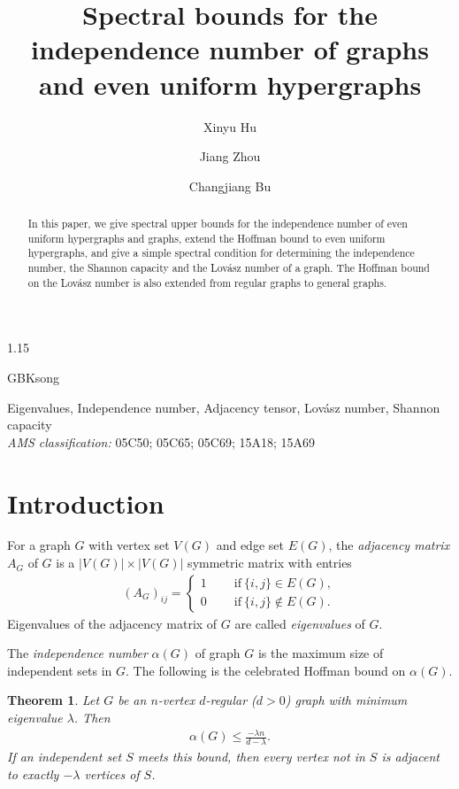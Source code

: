 \documentclass[preprint,12pt]{elsarticle}
\newtheorem{thm}{Theorem}[section]
\begin{document}
\begin{spacing}{1.15}
\begin{CJK*}{GBK}{song}
\begin{frontmatter}
\title{\textbf{Spectral bounds for the independence number of graphs and even uniform hypergraphs}}

\author{Xinyu Hu}
\author{Jiang Zhou}
\author{Changjiang Bu}

\address{College of Mathematical Sciences, Harbin Engineering University, Harbin 150001, PR China}

\begin{abstract}
In this paper, we give spectral upper bounds for the independence number of even uniform hypergraphs and graphs, extend the Hoffman bound to even uniform hypergraphs, and give a simple spectral condition for determining the independence number, the Shannon capacity and the Lov\'{a}sz number of a graph. The Hoffman bound on the Lov\'{a}sz number is also extended from regular graphs to general graphs.
\end{abstract}

\begin{keyword}
Eigenvalues, Independence number, Adjacency tensor, Lov\'{a}sz number, Shannon capacity
\\
\emph{AMS classification:} 05C50; 05C65; 05C69; 15A18; 15A69
\end{keyword}
\end{frontmatter}


\section{Introduction}
For a graph $G$ with vertex set $V(G)$ and edge set $E(G)$, the \textit{adjacency matrix} $A_G$ of $G$ is a $|V(G)|\times|V(G)|$ symmetric matrix with entries
\begin{eqnarray*}
(A_G)_{ij}=\begin{cases}1~~~~~~~~~~\mbox{if}~\{i,j\}\in E(G),\\
0~~~~~~~~~~\mbox{if}~\{i,j\}\notin E(G).\end{cases}
\end{eqnarray*}
Eigenvalues of the adjacency matrix of $G$ are called \textit{eigenvalues} of $G$.

The \textit{independence number} $\alpha(G)$ of graph $G$ is the maximum size of independent sets in $G$. The following is the celebrated Hoffman bound on $\alpha(G)$.
\begin{thm}\label{Hoffman}
\textup{\cite{Brouwer}} Let $G$ be an $n$-vertex $d$-regular ($d>0$) graph with minimum eigenvalue $\lambda$. Then
\begin{eqnarray*}
\alpha(G) \leqslant\frac{-\lambda n}{{d - {\lambda }}}.
\end{eqnarray*}
If an independent set $S$ meets this bound, then every vertex not in $S$ is adjacent to exactly $-\lambda$ vertices of $S$.
\end{thm}


\end{CJK*}
\end{spacing}
\end{document}
